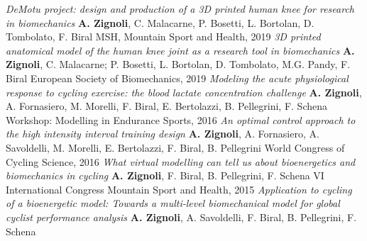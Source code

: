 \documentclass[helvetica,openbib,logo,notitle,flagCMYK,totpages]{europecv}
\begin{document}
\begin{europecv}
{	       \newline
	       \emph{DeMotu project: design and production of a 3D printed human knee for research in biomechanics}             \newline
	       \textbf{A. Zignoli}, C. Malacarne, P. Bosetti, L. Bortolan, D. Tombolato, F. Biral \newline
	       MSH, Mountain Sport and Health, 2019
	       \newline
	       \newline
	       \emph{3D printed anatomical model of the human knee joint as a research tool in biomechanics}             \newline
	       \textbf{A. Zignoli}, C. Malacarne; P. Bosetti, L. Bortolan, D. Tombolato, M.G. Pandy, F. Biral
  \newline
	      European Society of Biomechanics, 2019
 \newline 
  	       \emph{Modeling the acute physiological response to cycling
exercise: the blood lactate concentration challenge}\newline
	       \textbf{A. Zignoli}, A. Fornasiero, M. Morelli, F. Biral, E. Bertolazzi, B. Pellegrini, F. Schena \newline
	       Workshop: Modelling in Endurance Sports, 2016 \newline 
	       \newline
	       	       \emph{An optimal control approach to the high intensity interval training design}\newline 
	       \textbf{A. Zignoli}, A. Fornasiero, A. Savoldelli, M. Morelli, E. Bertolazzi, F. Biral, B. Pellegrini \newline 
	       World Congress of Cycling Science, 2016 \newline
	       \newline
	       \emph{What virtual modelling can tell us about bioenergetics and biomechanics in cycling}\newline 
	       \textbf{A. Zignoli}, F. Biral, B. Pellegrini, F. Schena \newline 
	       VI International Congress Mountain Sport and Health, 2015 \newline
	       \newline
	       \emph{Application to cycling of a bioenergetic model: Towards a multi-level biomechanical model for global cyclist performance analysis} \newline
	        \textbf{A. Zignoli}, A. Savoldelli, F. Biral, B. Pellegrini, F. Schena \newline
}
\end{europecv}
\end{document}
